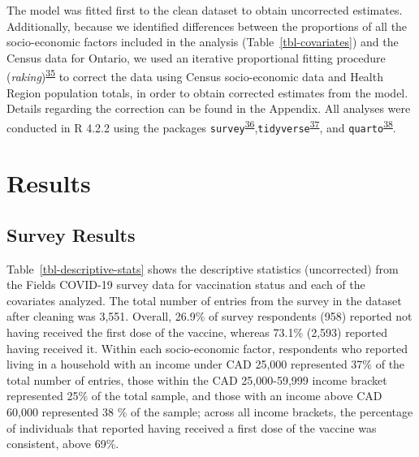 \documentclass[
  letterpaper,
  DIV=11,
  numbers=noendperiod]{scrartcl}
\begin{document}
The model was fitted first to the clean dataset to obtain uncorrected
estimates. Additionally, because we identified differences between the
proportions of all the socio-economic factors included in the analysis
(Table~\ref{tbl-covariates}) and the Census data for Ontario, we used an
iterative proportional fitting procedure
(\emph{raking})\textsuperscript{\protect\hyperlink{ref-deming1940}{35}}
to correct the data using Census socio-economic data and Health Region
population totals, in order to obtain corrected estimates from the
model. Details regarding the correction can be found in the Appendix.
All analyses were conducted in R 4.2.2 using the packages
\texttt{survey}\textsuperscript{\protect\hyperlink{ref-lumley2011}{36}},\texttt{tidyverse}\textsuperscript{\protect\hyperlink{ref-wickham2019}{37}},
and \texttt{quarto}\textsuperscript{\protect\hyperlink{ref-quarto}{38}}.

\hypertarget{results}{%
\section{Results}\label{results}}

\hypertarget{survey-results}{%
\subsection{Survey Results}\label{survey-results}}

Table~\ref{tbl-descriptive-stats} shows the descriptive statistics
(uncorrected) from the Fields COVID-19 survey data for vaccination
status and each of the covariates analyzed. The total number of entries
from the survey in the dataset after cleaning was 3,551. Overall, 26.9\%
of survey respondents (958) reported not having received the first dose
of the vaccine, whereas 73.1\% (2,593) reported having received it.
Within each socio-economic factor, respondents who reported living in a
household with an income under CAD 25,000 represented 37\% of the total
number of entries, those within the CAD 25,000-59,999 income bracket
represented 25\% of the total sample, and those with an income above CAD
60,000 represented 38 \% of the sample; across all income brackets, the
percentage of individuals that reported having received a first dose of
the vaccine was consistent, above 69\%.
\end{document}
